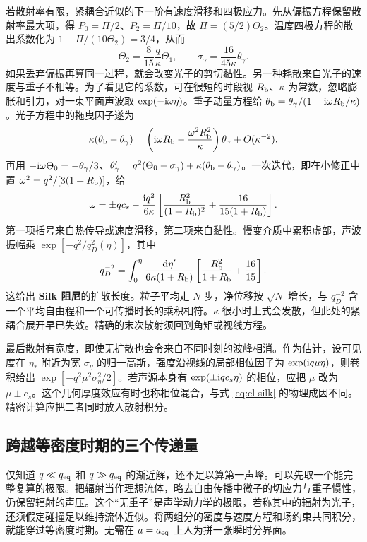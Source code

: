 若散射率有限，紧耦合近似的下一阶有速度滑移和四极应力。先从偏振方程保留散射率最大项，得 $P_0=\Pi/2$、$P_2=\Pi/10$，故 $\Pi=(5/2)\Theta_2$。温度四极方程的散出系数化为 $1-\Pi/(10\Theta_2)=3/4$，从而
\[
 \Theta_2=\frac{8}{15}\frac q\kappa\Theta_1,\qquad
 \sigma_\gamma=\frac{16}{45\kappa}\theta_\gamma .
\]
如果丢弃偏振再算同一过程，就会改变光子的剪切黏性。另一种耗散来自光子的速度与重子不相等。为了看见它的系数，可在很短的时段视 $R_{\rm b}$、$\kappa$ 为常数，忽略膨胀和引力，对一束平面声波取 $\exp(-\mathrm{i}\omega\eta)$。重子动量方程给 $\theta_{\rm b}=\theta_\gamma/(1-\mathrm{i}\omega R_{\rm b}/\kappa)$。光子方程中的拖曳因子遂为
\[
 \kappa(\theta_{\rm b}-\theta_\gamma)
   =\left(\mathrm{i}\omega R_{\rm b}-\frac{\omega^2R_{\rm b}^2}{\kappa}\right)
       \theta_\gamma+O(\kappa^{-2}) .
\]
再用 $-\mathrm{i}\omega\Theta_0=-\theta_\gamma/3$、$\theta_\gamma'=
q^2(\Theta_0-\sigma_\gamma)+\kappa(\theta_{\rm b}-\theta_\gamma)$。一次迭代，即在小修正中置 $\omega^2=q^2/[3(1+R_{\rm b})]$，给
\[
 \omega=\pm q c_s-\frac{\mathrm{i} q^2}{6\kappa}
  \left[\frac{R_{\rm b}^2}{(1+R_{\rm b})^2}
           +\frac{16}{15(1+R_{\rm b})}\right].
\]
第一项括号来自热传导或速度滑移，第二项来自黏性。慢变介质中累积虚部，声波振幅乘 $\exp[-q^2/q_D^2(\eta)]$，其中
\begin{equation}\label{eq:cl-silk}
 q_D^{-2}=\int_0^\eta\frac{\dd\eta'}{6\kappa(1+R_{\rm b})}
       \left[\frac{R_{\rm b}^2}{1+R_{\rm b}}+\frac{16}{15}\right].
\end{equation}
这给出 \textbf{Silk 阻尼}的扩散长度。粒子平均走 $N$ 步，净位移按 $\sqrt N$ 增长，与 $q_D^{-2}$ 含一个平均自由程和一个可传播时长的乘积相符。$\kappa$ 很小时上式会发散，但此处的紧耦合展开早已失效。精确的末次散射须回到角矩或视线方程。

最后散射有宽度，即使无扩散也会令来自不同时刻的波峰相消。作为估计，设可见度在 $\eta_*$ 附近为宽 $\sigma_\eta$ 的归一高斯，强度沿视线的局部相位因子为 $\exp(\mathrm{i} q\mu\eta)$，则卷积给出 $\exp[-q^2\mu^2\sigma_\eta^2/2]$。若声源本身有 $\exp(\pm\mathrm{i} q c_s\eta)$ 的相位，应把 $\mu$ 改为 $\mu\pm c_s$。这个几何厚度效应有时也称相位混合，与式 \eqref{eq:cl-silk} 的物理成因不同。精密计算应把二者同时放入散射积分。

\subsection{跨越等密度时期的三个传递量}\label{sec:cosmo-transfer-three}

仅知道 $q\ll q_{\rm eq}$ 和 $q\gg q_{\rm eq}$ 的渐近解，还不足以算第一声峰。可以先取一个能完整复算的极限。把辐射当作理想流体，略去自由传播中微子的切应力与重子惯性，仍保留辐射的声压。这个“无重子”是声学动力学的极限，若称其中的辐射为光子，还须假定碰撞足以维持流体近似。将两组分的密度与速度方程和场约束共同积分，就能穿过等密度时期。无需在 $a=a_{\rm eq}$ 上人为拼一张瞬时分界面。

